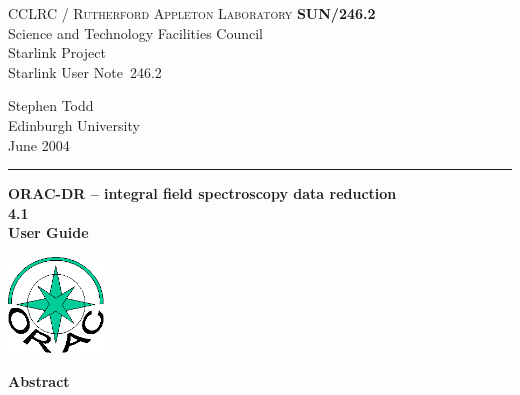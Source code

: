 \documentclass[twoside,11pt]{article}
\newcommand{\stardoccategory}  {Starlink User Note}
\newcommand{\stardocinitials}  {SUN}
\newcommand{\stardocnumber}    {246.2}
\newcommand{\stardocauthors}   {Stephen Todd \\
                                Edinburgh University}
\newcommand{\stardocdate}      {June 2004}
\newcommand{\stardoctitle}     {ORAC-DR -- integral field spectroscopy
  data reduction}
\newcommand{\stardocversion}   {4.1}
\newcommand{\stardocmanual}    {User Guide}
\newcommand{\stardocname}{\stardocinitials /\stardocnumber}
\newenvironment{latexonly}{}{}
\renewcommand{\_}{\texttt{\symbol{95}}}
\begin{document}
\setcounter{secnumdepth}{5}
\thispagestyle{empty}

\begin{latexonly}
   CCLRC / \textsc{Rutherford Appleton Laboratory} \hfill \textbf{\stardocname}\\
   {\large Science and Technology Facilities Council}\\
   {\large Starlink Project\\ }
   {\large \stardoccategory\ \stardocnumber}
   \begin{flushright}
   \stardocauthors\\
   \stardocdate
   \end{flushright}
   \vspace{-4mm}
   \rule{\textwidth}{0.5mm}
   \vspace{5mm}
   \begin{center}
   {\Huge\textbf{\stardoctitle \\ [2.5ex]}}
   {\LARGE\textbf{\stardocversion \\ [4ex]}}
   {\Huge\textbf{\stardocmanual}}
   \end{center}
   \vspace{5mm}

\begin{center}
\includegraphics[width=1.0in]{sun246_logo}
\end{center}

   \vspace{10mm}
   \begin{center}
      {\Large\textbf{Abstract}}
   \end{center}
\end{latexonly}
\end{document}

